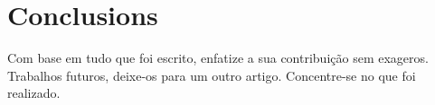 \section{Conclusions}


Com base em tudo que foi escrito, enfatize a sua contribuição sem exageros.
Trabalhos futuros, deixe-os para um outro artigo. Concentre-se no que foi realizado.

